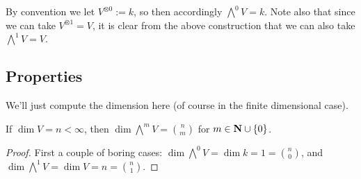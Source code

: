 \begin{rem}
  By convention we let $V^{\otimes 0} := k$, so then accordingly $\bigwedge^0 V = k$. Note also that since we can take $V^{\otimes 1} = V$, it is clear from the above construction that we can also take $\bigwedge^1 V = V$.
\end{rem}

\subsection{Properties}

We'll just compute the dimension here (of course in the finite dimensional case). 

\begin{pro}
  If $\dim V = n < \infty$, then $\dim \bigwedge^m V = \binom nm$ for $m \in \boldsymbol{\mathbf{N}} \cup \left\{0\right\}$.
  \begin{proof}
    First a couple of boring cases: $\dim \bigwedge^0 V = \dim k = 1 = \binom n0$, and $\dim \bigwedge^1 V = \dim V = n = \binom n1$. 


\end{proof}
\end{pro}

